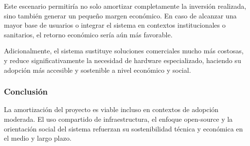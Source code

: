Este escenario permitiría no solo amortizar completamente la inversión realizada, sino también generar un pequeño margen económico. En caso de alcanzar una mayor base de usuarios o integrar el sistema en contextos institucionales o sanitarios, el retorno económico sería aún más favorable.

Adicionalmente, el sistema sustituye soluciones comerciales mucho más costosas, y reduce significativamente la necesidad de hardware especializado, haciendo su adopción más accesible y sostenible a nivel económico y social.

\subsubsection{Conclusión} 

La amortización del proyecto es viable incluso en contextos de adopción moderada. El uso compartido de infraestructura, el enfoque open-source y la orientación social del sistema refuerzan su sostenibilidad técnica y económica en el medio y largo plazo.

